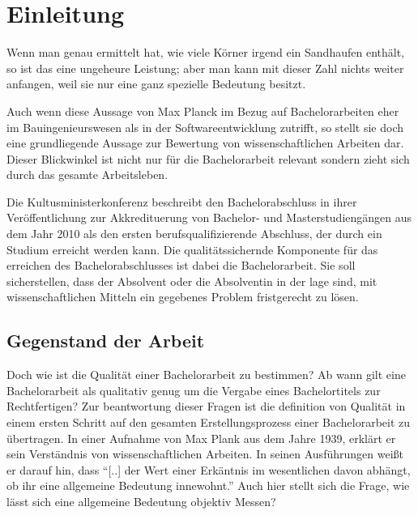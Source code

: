 
\chapter{Einleitung}
\begin{displayquote}
    Wenn man genau ermittelt hat, wie viele Körner irgend ein Sandhaufen enthält, so ist das eine ungeheure Leistung; aber man kann mit dieser Zahl nichts weiter anfangen, weil sie nur eine ganz spezielle Bedeutung besitzt.
\end{displayquote}

Auch wenn diese Aussage von Max Planck im Bezug auf Bachelorarbeiten eher im Bauingenieurswesen als in der Softwareentwicklung zutrifft, so stellt sie doch eine grundliegende Aussage zur Bewertung von wissenschaftlichen Arbeiten dar. Dieser Blickwinkel ist nicht nur für die Bachelorarbeit relevant sondern zieht sich durch das gesamte Arbeitsleben. 

Die Kultusministerkonferenz beschreibt den Bachelorabschluss in ihrer Veröffentlichung zur Akkredituerung von Bachelor- und Masterstudiengängen aus dem Jahr 2010 als den ersten berufsqualifizierende Abschluss, der durch ein Studium erreicht werden kann. Die qualitätssichernde Komponente für das erreichen des Bachelorabschlusses ist dabei die Bachelorarbeit. Sie soll sicherstellen, dass der Absolvent oder die Absolventin in der lage sind, mit wissenschaftlichen Mitteln ein gegebenes Problem fristgerecht zu lösen.\cite[Vgl.][S.4]{kmk:2010}



\section{Gegenstand der Arbeit}
Doch wie ist die Qualität einer Bachelorarbeit zu bestimmen? Ab wann gilt eine Bachelorarbeit als qualitativ genug um die Vergabe eines Bachelortitels zur Rechtfertigen? Zur beantwortung dieser Fragen ist die definition von Qualität in einem ersten Schritt auf den gesamten Erstellungsprozess einer Bachelorarbeit zu übertragen. 
In einer Aufnahme von Max Plank aus dem Jahre 1939, erklärt er sein Verständnis von wissenschaftlichen Arbeiten. In seinen Ausführungen weißt er darauf hin, dass \enquote{[..]  der Wert einer Erkäntnis im wesentlichen davon abhängt, ob ihr eine allgemeine Bedeutung innewohnt.}\cite{Herneck:1976}
Auch hier stellt sich die Frage, wie lässt sich eine allgemeine Bedeutung objektiv Messen? 

